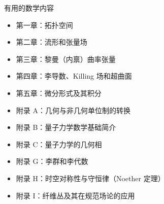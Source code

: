 
有用的数学内容
\begin{itemize}
\item 第一章：拓扑空间
\item 第二章：流形和张量场
\item 第三章：黎曼（内禀）曲率张量
\item 第四章：李导数、Killing 场和超曲面
\item 第五章：微分形式及其积分
\item 附录 A：几何与非几何单位制的转换
\item 附录 B：量子力学数学基础简介
\item 附录 C：量子力学的几何相
\item 附录 G：李群和李代数
\item 附录 H：时空对称性与守恒律（Noether 定理）
\item 附录 I：纤维丛及其在规范场论的应用
\end{itemize}
